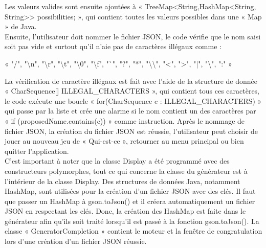 \documentclass[a4paper]{article}
\begin{document}
Les valeurs valides sont ensuite ajoutées à « TreeMap<String,HashMap<String, String>> possibilities; », qui contient toutes les valeurs possibles dans une « Map » de Java.\\
Ensuite, l’utilisateur doit nommer le fichier JSON, le code vérifie que le nom saisi soit pas vide et surtout qu’il n’aie pas de caractères illégaux comme :
\begin{center}
 « "/", "\textbackslash n", "\textbackslash r", "\textbackslash t", "\textbackslash 0", "\textbackslash f", "`", "?", "*", "\textbackslash \textbackslash", "<", ">", "|", "\textbackslash", ":" »\\
\end{center}

La vérification de caractère illégaux est fait avec l’aide de la structure de donnée « CharSequence[] ILLEGAL\_CHARACTERS », qui contient tous ces caractères, le code exécute une boucle « for(CharSequence c : ILLEGAL\_CHARACTERS) » qui passe par la liste et crée une alarme si le nom contient un des caractères par « if (proposedName.contains(c)) » comme instruction. Après le nommage de fichier JSON, la création du fichier JSON est réussie, l’utilisateur peut choisir de jouer au nouveau jeu de « Qui-est-ce », retourner au menu principal ou bien quitter l’application.\\

C’est important à noter que la classe Display a été programmé avec des constructeurs polymorphes, tout ce qui concerne la classe du générateur est à l'intérieur de la classe Display. Des structures de données Java, notamment HashMap, sont utilisées pour la création d’un fichier JSON avec des clés. Il faut que passer un HashMap à gson.toJson() et il créera automatiquement un fichier JSON en respectant les clés. Donc, la création des HashMap est faite dans le générateur afin qu'ils soit traité lorsqu’il est passé à la fonction gson.toJson(). La classe « GeneratorCompletion » contient le moteur et la fenêtre de congratulation lors d’une création d’un fichier JSON réussie.\\
\end{document}
